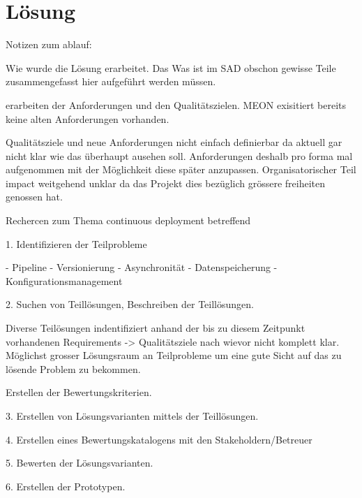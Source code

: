 \chapter{Lösung}

Notizen zum ablauf:

Wie wurde die Lösung erarbeitet. Das Was ist im SAD obschon gewisse Teile zusammengefasst hier aufgeführt werden müssen.

erarbeiten der Anforderungen und den Qualitätszielen. MEON exisitiert bereits keine alten Anforderungen vorhanden. 

Qualitätsziele und neue Anforderungen nicht einfach definierbar da aktuell gar nicht klar wie das überhaupt ausehen soll. Anforderungen deshalb pro forma mal aufgenommen mit der Möglichkeit diese später anzupassen.
Organisatorischer Teil impact weitgehend unklar da das Projekt dies bezüglich grössere freiheiten genossen hat. 

Rechercen zum Thema continuous deployment betreffend

1. Identifizieren der Teilprobleme

- Pipeline
- Versionierung
- Asynchronität
- Datenspeicherung
- Konfigurationsmanagement

2. Suchen von Teillösungen, Beschreiben der Teillösungen.

Diverse Teilösungen indentifiziert anhand der bis zu diesem Zeitpunkt vorhandenen Requirements -> Qualitätsziele nach wievor nicht komplett klar.
Möglichst grosser Lösungsraum an Teilprobleme um eine gute Sicht auf das zu lösende Problem zu bekommen.


Erstellen der Bewertungskriterien.

3. Erstellen von Lösungsvarianten mittels der Teillösungen.

4. Erstellen eines Bewertungskatalogens mit den Stakeholdern/Betreuer

5. Bewerten der Lösungsvarianten.

6. Erstellen der Prototypen.
